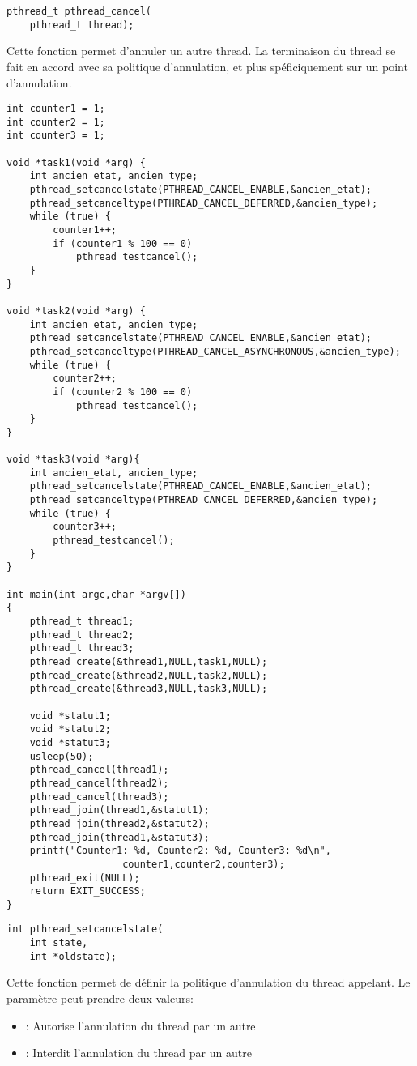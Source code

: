 \label{func:pthread_cancel}

\begin{lstlisting}
pthread_t pthread_cancel(
	pthread_t thread);
\end{lstlisting}
Cette fonction permet d'annuler un autre thread. La terminaison du thread se fait en accord avec sa politique d'annulation, et plus spéficiquement sur un point d'annulation.
\begin{lstlisting}
int counter1 = 1;
int counter2 = 1;
int counter3 = 1;

void *task1(void *arg) {
	int ancien_etat, ancien_type;
	pthread_setcancelstate(PTHREAD_CANCEL_ENABLE,&ancien_etat);
	pthread_setcanceltype(PTHREAD_CANCEL_DEFERRED,&ancien_type);
	while (true) {
		counter1++;
		if (counter1 % 100 == 0)
			pthread_testcancel();
	}
}

void *task2(void *arg) {
	int ancien_etat, ancien_type;
	pthread_setcancelstate(PTHREAD_CANCEL_ENABLE,&ancien_etat);
	pthread_setcanceltype(PTHREAD_CANCEL_ASYNCHRONOUS,&ancien_type);
	while (true) {
		counter2++;
		if (counter2 % 100 == 0)
			pthread_testcancel();
	}
}

void *task3(void *arg){
	int ancien_etat, ancien_type;
	pthread_setcancelstate(PTHREAD_CANCEL_ENABLE,&ancien_etat);
	pthread_setcanceltype(PTHREAD_CANCEL_DEFERRED,&ancien_type);
	while (true) {
		counter3++;
		pthread_testcancel();
	}
}

int main(int argc,char *argv[])
{
	pthread_t thread1;
	pthread_t thread2;
	pthread_t thread3;
	pthread_create(&thread1,NULL,task1,NULL);
	pthread_create(&thread2,NULL,task2,NULL);
	pthread_create(&thread3,NULL,task3,NULL);

	void *statut1;
	void *statut2;
	void *statut3;
	usleep(50);
	pthread_cancel(thread1);
	pthread_cancel(thread2);
	pthread_cancel(thread3);
	pthread_join(thread1,&statut1);
	pthread_join(thread2,&statut2);
	pthread_join(thread1,&statut3);
	printf("Counter1: %d, Counter2: %d, Counter3: %d\n",
					counter1,counter2,counter3);
	pthread_exit(NULL);
	return EXIT_SUCCESS;
}
\end{lstlisting}


\label{func:pthread_setcancelstate}

\begin{lstlisting}
int pthread_setcancelstate(
	int state,
	int *oldstate);
\end{lstlisting}
Cette fonction permet de définir la politique d'annulation du thread appelant. Le paramètre  peut prendre deux valeurs:
\begin{itemize}
	\item {}: Autorise l'annulation du thread par un autre
	\item {}: Interdit l'annulation du thread par un autre
\end{itemize}

